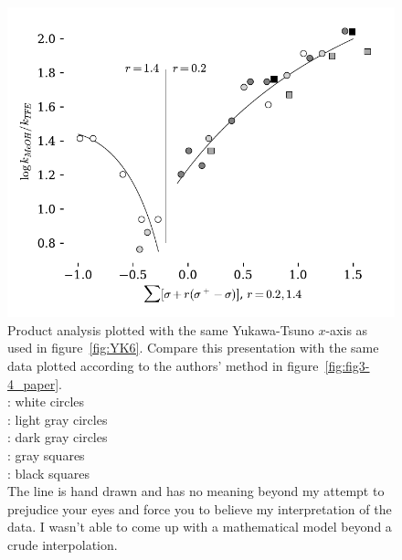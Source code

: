 \documentclass{tufte-handout}
\begin{document}
\begin{figure}[h!]
  \centering
  \includegraphics[scale=0.8]{images/plot13.pdf}
  \caption[-5mm]{Product analysis plotted with the same Yukawa-Tsuno $x$-axis as used in figure~\ref{fig:YK6}. Compare this presentation with the same data plotted according to the authors' method in figure~\ref{fig:fig3-4_paper}.  \vspace{2mm} \\
  : white circles  \\
  : light gray circles  \\
  : dark gray circles  \\
  : gray squares   \\
  : black squares   \vspace{2mm}  \\

 The line is hand drawn and has no meaning beyond my attempt to prejudice your eyes and force you to believe my interpretation of the data. I wasn't able to come up with a mathematical model beyond a crude interpolation. 
 } 
\label{fig:YK7}
\end{figure}
\end{document}

